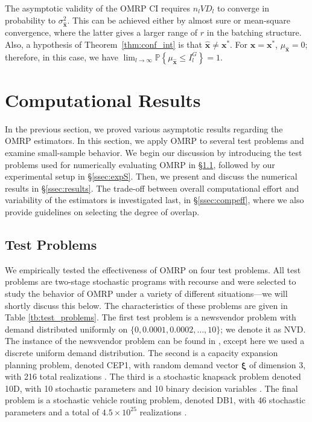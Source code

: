 \documentclass[12pt]{article}
\newcommand{\p}[1]{\mathbb{P} \left\{ #1 \right\}}
\newcommand{\x}{\mathbf{x}}
\newcommand{\xh}{{\hat{\x}}}
\newcommand{\xs}{\x^*}
\newcommand{\xit}{\boldsymbol{\xi}}
\begin{document}
The asymptotic validity of the OMRP CI requires $n_l VD_l$ to converge in probability to $\sigma^{2}_{\xh}$. 
This can be achieved either by almost sure or mean-square convergence, where the latter gives a larger range of $r$ in the batching structure.
Also, a hypothesis of Theorem~\ref{thm:conf_int} is that $\xh \neq \xs$.  
For $\xh = \xs$, $\mu_\xh = 0$; therefore, in this case, we have $\lim_{l\rightarrow\infty} \p{\mu_\xh \leq I^G_l} = 1$. 

\section{Computational Results}
\label{sec:comp}

In the previous section, we proved various asymptotic results regarding the OMRP estimators. 
In this section, we apply OMRP to several test problems and examine small-sample behavior. 
We begin our discussion by introducing the test problems used for numerically evaluating OMRP in \S \ref{ssec:test}, followed by our experimental setup in \S \ref{ssec:expS}. 
Then, we present and discuss the numerical results in \S \ref{ssec:results}.
The trade-off between overall computational effort and variability of the estimators is investigated last, in \S \ref{ssec:compeff}, where we also provide guidelines on selecting the degree of overlap. 

\subsection{Test Problems}
\label{ssec:test}


We empirically tested the effectiveness of OMRP on four test problems.
All test problems are two-stage stochastic programs with recourse and were selected to study the behavior of OMRP under a variety of different situations---we will shortly discuss this below.
The characteristics of these problems are given in Table \ref{tb:test_problems}. 
The first test problem is a newsvendor problem with demand distributed uniformly on $\{0, 0.0001, 0.0002, \dots, 10\}$; we denote it as NVD.
The instance of the newsvendor problem can be found in \citep{Bayraksan2006}, except here we used a discrete uniform demand distribution.
The second is a capacity expansion planning problem, denoted CEP1, with random demand vector $\xit$ of dimension 3, with 216 total realizations \citep{higle1996}.
The third is a stochastic knapsack problem denoted 10D, with 10 stochastic parameters and 10 binary decision variables \citep{kleywegt2002sample}.
The final problem is a stochastic vehicle routing problem, denoted DB1, with 46 stochastic parameters and a total of $4.5 \times 10^{25}$ realizations \citep{donohue1995upper}.
\end{document}
